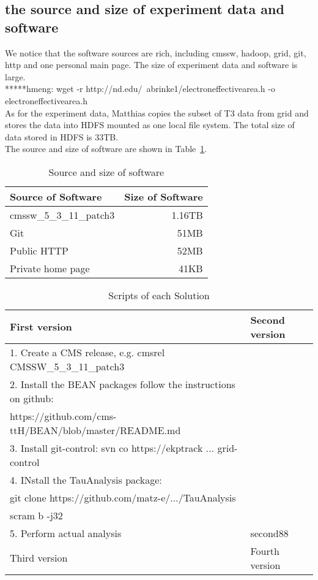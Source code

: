 \documentclass{article}
\begin{document}
\subsection{the source and size of experiment data and software}
We notice that the software sources are rich, including cmssw, hadoop, grid, git, http and one personal main page. The size of experiment data and software is large.\\

*****hmeng: wget -r http://nd.edu/~abrinke1/electroneffectivearea.h -o electroneffectivearea.h\\ 

As for the experiment data, Matthias copies the subset of T3 data from grid and stores the data into HDFS mounted as one local file system. The total size of data stored in HDFS is 33TB.\\

The source and size of software are shown in Table~\ref{table:software-source-size}.\\

\begin{table}
    \centering
    \begin{tabular}{|l|r|}
        \hline
        Source of Software & Size of Software \\ \hline
        cmssw\_5\_3\_11\_patch3 & 1.16TB \\ \hline
        Git & 51MB \\ \hline
        Public HTTP & 52MB \\ \hline
        Private home page & 41KB \\ \hline
    \end{tabular}
    \caption{Source and size of software}
    \label{table:software-source-size}
\end{table}

\begin{table}
    \centering
    \begin{tabular}{|l|l|}
        \hline
        First version & Second version \\ \hline
        1. Create a CMS release, e.g. cmsrel CMSSW\_5\_3\_11\_patch3 \\
        2. Install the BEAN packages follow the instructions on github:\\
            https://github.com/cms-ttH/BEAN/blob/master/README.md\\
        3. Install git-control: svn co https://ekptrack ... grid-control\\
        4. INstall the TauAnalysis package: \\
            git clone https://github.com/matz-e/.../TauAnalysis\\
            scram b -j32 \\
        5. Perform actual analysis & second88 \\ \hline
        Third version & Fourth version \\ \hline
    \end{tabular}
    \caption{Scripts of each Solution}
    \label{table:scripts}
\end{table}
\end{document}
